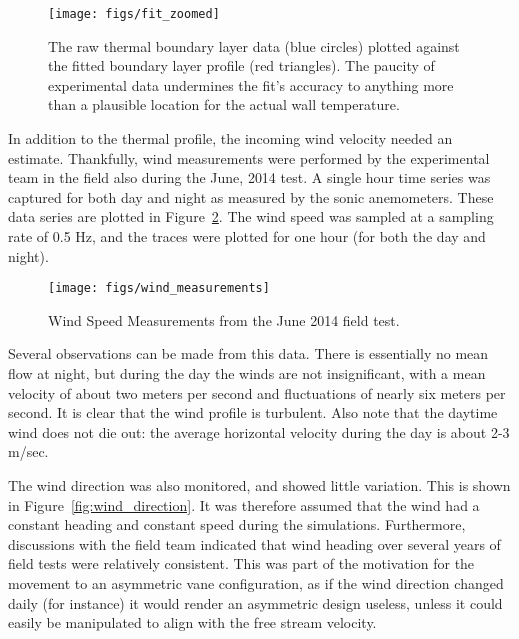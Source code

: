  \begin{figure}[!htb]
  \begin{center}
   \texttt{[image: figs/fit\_zoomed]}
   \caption{The raw thermal boundary layer data (blue circles) plotted
   against the fitted boundary layer profile (red triangles). The
   paucity of experimental data undermines the fit's accuracy to
   anything more than a plausible location for the actual wall
   temperature. }  
   \label{fig:thermal_profile_fit}
  \end{center}
 \end{figure}

In addition to the thermal profile, the incoming wind velocity needed an 
estimate. Thankfully, wind measurements were performed by the
experimental team in the field also during the June, 2014 test. A single 
hour time series was captured for both day and night as measured by the
sonic anemometers. These data series are plotted in
Figure~\ref{fig:wind_speed_estimate}. The wind speed was sampled at a
sampling rate of 0.5 Hz, and the traces were plotted for one hour (for
both the day and night). 

 \begin{figure}[!htb]
  \begin{center}
   \texttt{[image: figs/wind\_measurements]}
   \caption{Wind Speed Measurements from the June 2014 field test.}
   \label{fig:wind_speed_estimate}
  \end{center}
 \end{figure}

Several observations can be made from this data. There is essentially no
mean flow at night, but during the day the winds are not insignificant,
with a mean velocity of about two meters per second and fluctuations of
nearly six meters per second. It is clear that the wind profile is
turbulent.  Also note that the daytime wind does not die out: the
average horizontal velocity during the day is about 2-3 m/sec. 

The wind direction was also monitored, and showed little variation. 
This is shown in Figure~\ref{fig:wind_direction}. It was therefore
assumed that the wind had a constant heading and constant speed during
the simulations. Furthermore, discussions with the field team indicated
that wind heading over several years of field tests were relatively
consistent. This was part of the motivation for the movement to an
asymmetric vane configuration, as if the wind direction changed daily
(for instance) it would render an asymmetric design useless, unless it
could easily be manipulated to align with the free stream velocity. 

